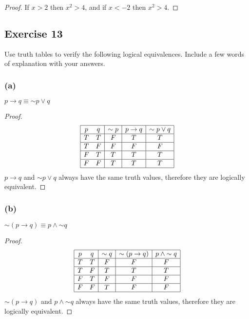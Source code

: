 \documentclass[14pt]{extarticle}
\begin{document}
\begin{proof}
    If $x > 2$ then $x^2 > 4$, and if $x < -2$ then $x^2 > 4$.
\end{proof}

\subsection{Exercise 13}
Use truth tables to verify the following logical equivalences. Include a few words of explanation with your answers.

\subsubsection{(a)}
$p \to q \equiv {\sim p} \vee q$

\begin{proof}
    $$
        \begin{array}{|cc|c|c|c|}
            \hline
            p & q & {\sim p} & p \to q & {\sim p} \vee q \\
            \hline
            T & T & F        & T       & T               \\
            \hline
            T & F & F        & F       & F               \\
            \hline
            F & T & T        & T       & T               \\
            \hline
            F & F & T        & T       & T               \\
            \hline
        \end{array}
    $$
    $p \to q$ and ${\sim p} \vee q$ always have the same truth values, therefore they are logically equivalent.
\end{proof}

\subsubsection{(b)}
${\sim (p \to q)} \equiv p \wedge {\sim q}$

\begin{proof}
    $$
        \begin{array}{|cc|c|c|c|}
            \hline
            p & q & {\sim q} & {\sim (p \to q)} & p \wedge {\sim q} \\ \hline
            T & T & F        & F                & F                 \\
            \hline
            T & F & T        & T                & T                 \\
            \hline
            F & T & F        & F                & F                 \\
            \hline
            F & F & T        & F                & F                 \\
            \hline
        \end{array}
    $$
    ${\sim (p \to q)}$ and $p \wedge {\sim q}$ always have the same truth values, therefore they are logically equivalent. \end{proof}
\end{document}
